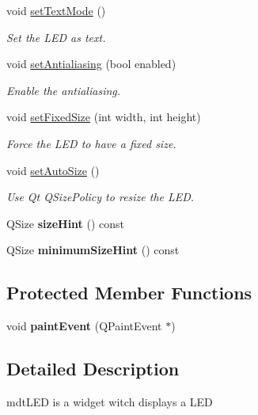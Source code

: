 \begin{DoxyCompactItemize}
void \hyperlink{classmdt_led_a6aabb78ea686814f316f88e20d024d39}{setTextMode} ()
\begin{DoxyCompactList}\small\item\em Set the LED as text. \end{DoxyCompactList}\item 
void \hyperlink{classmdt_led_ab8a997e610a2ad5572e1a6dbe7fbc256}{setAntialiasing} (bool enabled)
\begin{DoxyCompactList}\small\item\em Enable the antialiasing. \end{DoxyCompactList}\item 
void \hyperlink{classmdt_led_abd0fde0ce1eca75fe7c832557829089b}{setFixedSize} (int width, int height)
\begin{DoxyCompactList}\small\item\em Force the LED to have a fixed size. \end{DoxyCompactList}\item 
void \hyperlink{classmdt_led_a696570e6eb8f5b0a629fc6823ed2fe4d}{setAutoSize} ()
\begin{DoxyCompactList}\small\item\em Use Qt QSizePolicy to resize the LED. \end{DoxyCompactList}\item 
\hypertarget{classmdt_led_a44cf6e19e2640bc843d1ed096843e686}{
QSize {\bfseries sizeHint} () const }
\label{classmdt_led_a44cf6e19e2640bc843d1ed096843e686}

\item 
\hypertarget{classmdt_led_ae7d22257f19d57771299b321a8a17c50}{
QSize {\bfseries minimumSizeHint} () const }
\label{classmdt_led_ae7d22257f19d57771299b321a8a17c50}

\end{DoxyCompactItemize}
\subsection*{Protected Member Functions}
\begin{DoxyCompactItemize}
\item 
\hypertarget{classmdt_led_a1c96c8e06658ba569f7cf6b3fc3f5903}{
void {\bfseries paintEvent} (QPaintEvent $\ast$)}
\label{classmdt_led_a1c96c8e06658ba569f7cf6b3fc3f5903}

\end{DoxyCompactItemize}


\subsection{Detailed Description}
mdtLED is a widget witch displays a LED 



